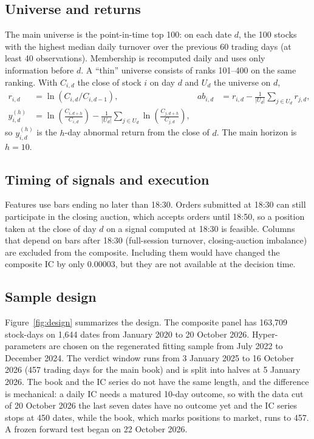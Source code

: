 \subsection{Universe and returns}

The main universe is the point-in-time top 100: on each date $d$, the 100 stocks with the highest median daily turnover over the previous 60 trading days (at least 40 observations). Membership is recomputed daily and uses only information before $d$. A ``thin'' universe consists of ranks 101--400 on the same ranking. With $C_{i,d}$ the close of stock $i$ on day $d$ and $U_d$ the universe on $d$,
\begin{align}
r_{i,d} &= \ln\!\left(C_{i,d}/C_{i,d-1}\right), & ab_{i,d} &= r_{i,d}-\frac{1}{|U_d|}\sum_{j\in U_d} r_{j,d},\\
y^{(h)}_{i,d} &= \ln\!\left(\frac{C_{i,d+h}}{C_{i,d}}\right)-\frac{1}{|U_d|}\sum_{j\in U_d}\ln\!\left(\frac{C_{j,d+h}}{C_{j,d}}\right), \label{eq:y}
\end{align}
so $y^{(h)}_{i,d}$ is the $h$-day abnormal return from the close of $d$. The main horizon is $h=10$.

\subsection{Timing of signals and execution}\label{sec:timing}

Features use bars ending no later than 18:30. Orders submitted at 18:30 can still participate in the closing auction, which accepts orders until 18:50, so a position taken at the close of day $d$ on a signal computed at 18:30 is feasible. Columns that depend on bars after 18:30 (full-session turnover, closing-auction imbalance) are excluded from the composite. Including them would have changed the composite IC by only 0.00003, but they are not available at the decision time.

\subsection{Sample design}\label{sec:design}

Figure~\ref{fig:design} summarizes the design. The composite panel has 163,709 stock-days on 1,644 dates from January 2020 to 20 October 2026. Hyper-parameters are chosen on the regenerated fitting sample from July 2022 to December 2024. The verdict window runs from 3 January 2025 to 16 October 2026 (457 trading days for the main book) and is split into halves at 5 January 2026. The book and the IC series do not have the same length, and the difference is mechanical: a daily IC needs a matured 10-day outcome, so with the data cut of 20 October 2026 the last seven dates have no outcome yet and the IC series stops at 450 dates, while the book, which marks positions to market, runs to 457. A frozen forward test began on 22 October 2026.


